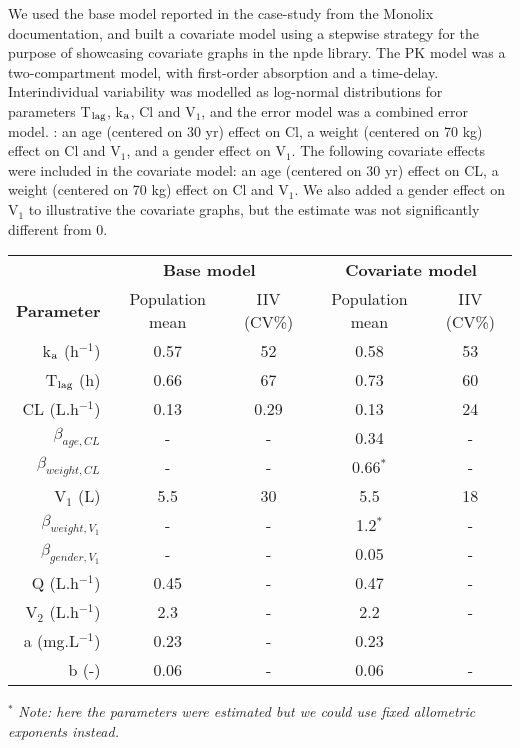 We used the base model reported in the case-study from the {\sf Monolix} documentation, and built a covariate model using a stepwise strategy for the purpose of showcasing covariate graphs in the {\sf npde} library.  The PK model was a two-compartment model, with first-order absorption and a time-delay. Interindividual variability was modelled as log-normal distributions for parameters T$_{\rm lag}$, k$_{\rm a}$, Cl and V$_1$, and the error model was a combined error model. : an age (centered on 30 yr) effect on Cl, a weight (centered on 70 kg) effect on Cl and V$_1$, and a gender effect on V$_1$. The following covariate effects were included in the covariate model: an age (centered on 30 yr) effect on CL, a weight (centered on 70 kg) effect on Cl and V$_1$. We also added a gender effect on V$_1$ to illustrative the covariate graphs, but the estimate was not significantly different from 0.

\begin{table}[!h]
\begin{center}
\begin{tabular}{r c c c c}
\hline 
& \multicolumn{2}{c}{\bf Base model} &  \multicolumn{2}{c}{\bf Covariate model} \\
{\bf Parameter} & Population mean & IIV (CV\%) & Population mean & IIV (CV\%) \\
\hline 
k$_{\rm a}$ (h$^{-1}$) & 0.57 & 52 & 0.58 & 53\\
T$_{\rm lag}$ (h) & 0.66 & 67 &  0.73 & 60\\
CL (L.h$^{-1}$) & 0.13 & 0.29 & 0.13 & 24 \\
$\beta_{age, CL}$ & - & - & 0.34 & -\\
$\beta_{weight, CL}$ & - & - & 0.66$^*$ & - \\
V$_1$ (L) & 5.5 & 30 & 5.5 & 18\\
$\beta_{weight, V_1}$ & - & - & 1.2$^*$ & -\\
$\beta_{gender, V_1}$ & - & - & 0.05 & - \\
Q (L.h$^{-1}$) & 0.45 & - & 0.47 & -\\
V$_2$ (L.h$^{-1}$) & 2.3 & - & 2.2 & - \\
a (mg.L$^{-1}$) & 0.23 & - & 0.23 \\
b (-) & 0.06 & - & 0.06 & -\\
\hline
\end{tabular}

$^*$ {\it Note: here the parameters were estimated but we could use fixed allometric exponents instead.}
\end{center}
\end{table}

